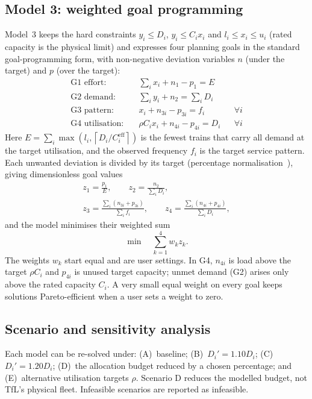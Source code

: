 \documentclass[conference]{IEEEtran}
\newcommand{\Ceff}{C^{\mathrm{eff}}}
\begin{document}
\subsection{Model 3: weighted goal programming}
Model~3 keeps the hard constraints $y_i \le D_i$, $y_i \le C_i x_i$ and $l_i \le x_i \le u_i$ (rated capacity is
the physical limit) and expresses four planning goals in the standard goal-programming form, with non-negative
deviation variables $n$ (under the target) and $p$ (over the target):
\begin{align}
\text{G1 effort:} \quad & \sum_i x_i + n_1 - p_1 = E \\
\text{G2 demand:} \quad & \sum_i y_i + n_2 = \sum_i D_i \\
\text{G3 pattern:} \quad & x_i + n_{3i} - p_{3i} = f_i && \forall i \\
\text{G4 utilisation:} \quad & \rho C_i x_i + n_{4i} - p_{4i} = D_i && \forall i
\end{align}
Here $E = \sum_i \max\left(l_i, \left\lceil D_i/\Ceff_i \right\rceil\right)$ is the fewest trains that carry all demand
at the target utilisation, and the observed frequency $f_i$ is the target service pattern. Each unwanted deviation is
divided by its target (percentage normalisation~\cite{tamiz1998,jones2010}), giving dimensionless goal values
\begin{equation}
\begin{gathered}
z_1 = \frac{p_1}{E}, \qquad z_2 = \frac{n_2}{\sum_i D_i}, \\
z_3 = \frac{\sum_i (n_{3i} + p_{3i})}{\sum_i f_i}, \qquad z_4 = \frac{\sum_i (n_{4i} + p_{4i})}{\sum_i D_i},
\end{gathered}
\end{equation}
and the model minimises their weighted sum
\begin{equation}
\min \quad \sum_{k=1}^{4} w_k z_k .
\end{equation}
The weights $w_k$ start equal and are user settings. In G4, $n_{4i}$ is load above the target $\rho C_i$ and
$p_{4i}$ is unused target capacity; unmet demand (G2) arises only above the rated capacity $C_i$. A very small equal
weight on every goal keeps solutions Pareto-efficient when a user sets a weight to zero.

\subsection{Scenario and sensitivity analysis}
Each model can be re-solved under: (A)~baseline; (B)~$D_i' = 1.10D_i$; (C)~$D_i' = 1.20D_i$; (D)~the allocation budget
reduced by a chosen percentage; and (E)~alternative utilisation targets $\rho$. Scenario D reduces the modelled
budget, not TfL's physical fleet. Infeasible scenarios are reported as infeasible.
\end{document}
